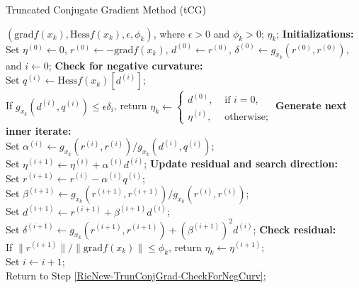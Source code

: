 \documentclass[11pt]{article}
\numberwithin{equation}{section}
\begin{document}
\begin{algorithm}[htbp]
  \caption{Truncated Conjugate Gradient Method (tCG)} 
  \begin{algorithmic}[1] \label{RieNew-TrunConjGrad}
  \REQUIRE $(\mathrm{grad}f(x_k), \mathrm{Hess}f(x_k), \epsilon, \phi_k)$, where $\epsilon>0$ and $\phi_k>0$;
  \ENSURE $\eta_k$;
  \STATE \label{RieNewtCG:st01} \textbf{Initializations:} \\ 
  Set $\eta^{(0)} \gets 0$, $r^{(0)}\gets -\mathrm{grad}f(x_k)$, $d^{(0)}\gets r^{(0)}$, $\delta^{(0)}\gets g_{x_k}(r^{(0)},r^{(0)})$, and $i\gets0$;
  \STATE \label{RieNewtCG:st02} \textbf{Check for negative curvature:} \label{RieNew-TrunConjGrad-CheckForNegCurv} \\ 
  Set $q^{(i)} \gets \mathrm{Hess}f(x_k)[d^{(i)}]$; \\
  If $g_{x_k}(d^{(i)}, q^{(i)}) \le \epsilon \delta_i$, return $\eta_k \gets \begin{cases} d^{(0)}, & \text{ if }i=0,\\ \eta^{(i)}, & \text{ otherwise}; \end{cases}$
  \STATE \label{RieNewtCG:st03} \textbf{Generate next inner iterate:}  \\ 
  Set $\alpha^{(i)} \gets g_{x_k}(r^{(i)}, r^{(i)})/g_{x_k}(d^{(i)},q^{(i)})$;\\ 
  Set $\eta^{(i+1)} \gets \eta^{(i)} + \alpha^{(i)}d^{(i)}$;
  \STATE \label{RieNewtCG:st04} \textbf{Update residual and search direction:} \\
  Set $r^{(i+1)} \gets r^{(i)} - \alpha^{(i)}q^{(i)}$; \\
  Set $\beta^{(i+1)}\gets g_{x_k}(r^{(i+1)},r^{(i+1)})/g_{x_k}(r^{(i)},r^{(i)})$;\\
  Set $d^{(i+1)} \gets r^{(i+1)} + \beta^{(i+1)}d^{(i)}$;\\ 
  Set $\delta^{(i+1)} \gets g_{x_k}(r^{(i+1)},r^{(i+1)}) + \left(\beta^{(i+1)}\right)^2d^{(i)}$; 
  \STATE \label{RieNewtCG:st05} \textbf{Check residual:} \\ 
  If $\|r^{(i+1)}\|/\|\mathrm{grad}f(x_k)\|\le \phi_k$, return $\eta_k\gets \eta^{(i+1)}$; \\
  Set $i\gets i+1$; \\
  Return to Step \ref{RieNew-TrunConjGrad-CheckForNegCurv};
 \end{algorithmic}
\end{algorithm}
\end{document}
